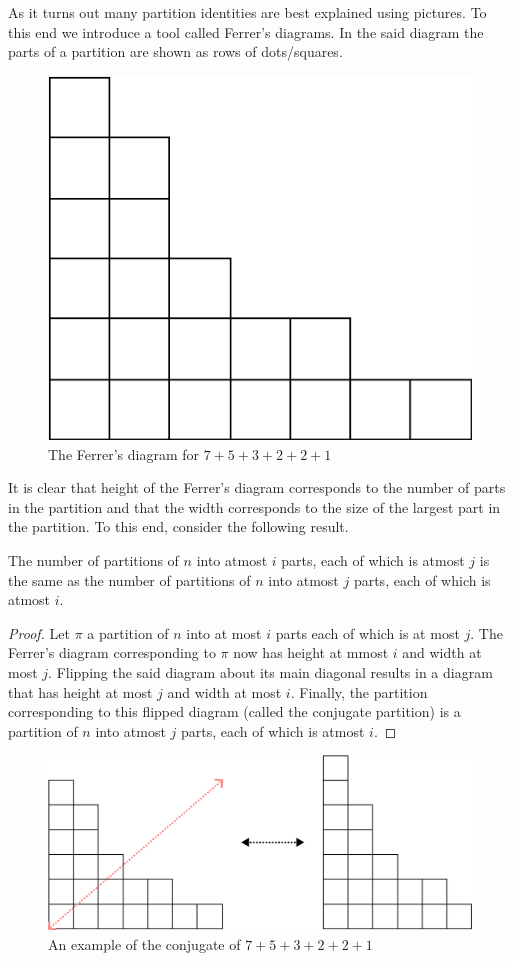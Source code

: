 \par
As it turns out many partition identities are best explained using pictures. To this end we introduce a tool called Ferrer's diagrams. In the said diagram the parts of a partition are shown as rows of dots/squares. 
\begin{figure}[H]
    \centering
    \includegraphics[width=0.5\linewidth]{Images/Figure17.png}
    \caption{The Ferrer's diagram for $7+5+3+2+2+1$}
\end{figure}
It is clear that height of the Ferrer's diagram corresponds to the number of parts in the partition and that the width corresponds to the size of the largest part in the partition. To this end, consider the following result. 
\begin{theorem}
The number of partitions of $n$ into atmost $i$ parts, each of which is atmost $j$ is the same as the number of partitions of $n$ into atmost $j$ parts, each of which is atmost $i$. 
\end{theorem}
\begin{proof}
Let $\pi$ a partition of $n$ into at most $i$ parts each of which is at most $j$. The Ferrer's diagram corresponding to $\pi$ now has height at mmost $i$ and width at most $j$. Flipping the said diagram about its main diagonal results in a diagram that has height at most $j$ and width at most $i$. Finally, the partition corresponding to this flipped diagram (called the conjugate partition) is a partition of $n$ into atmost $j$ parts, each of which is atmost $i$. 
\end{proof}
\begin{figure}[H]
    \centering
    \includegraphics[width=0.8\linewidth]{Images/Figure18.png}
    \caption{An example of the conjugate of $7+5+3+2+2+1$}
\end{figure}
